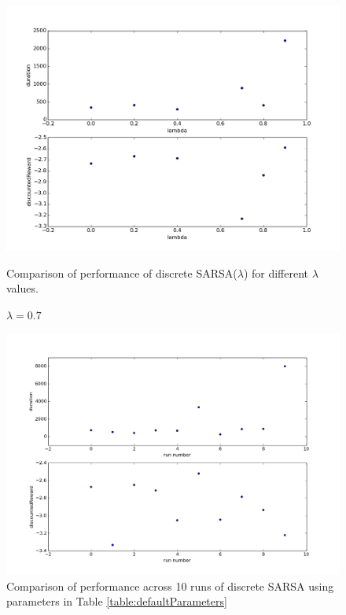 \documentclass{article}
\begin{document}
\begin{figure}
\centering
\includegraphics[scale=0.5]{figures/discreteSARSALamComparison.png}
\caption{Comparison of performance of discrete SARSA($\lambda$) for different $\lambda$ values.}
\caption{$\lambda = 0.7$}

\label{figures/discreteSARSALamComparison.png}
\end{figure}

\begin{figure}
\centering
\includegraphics[scale=0.5]{figures/sarsaMultiple.png}
\caption{Comparison of performance across 10 runs of discrete SARSA using parameters in Table \ref{table:defaultParameters}}
\label{figures/sarsaMultiple.png}
\end{figure}
\end{document}
